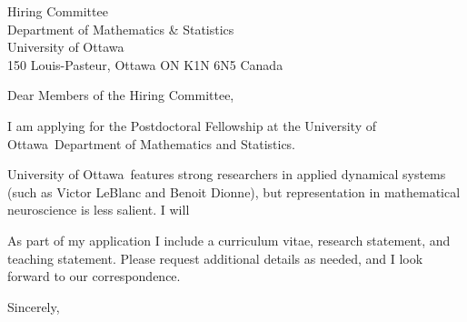 \documentclass[11pt,a4paper]{letter}
\begin{document}
\def\School{University of Ottawa}
\begin{letter}
{Hiring Committee\\
Department of Mathematics \& Statistics\\
University of Ottawa\\
150 Louis-Pasteur, Ottawa ON K1N 6N5 Canada}


\opening{Dear Members of the Hiring Committee,}

I am applying for the Postdoctoral Fellowship at the \School~Department of Mathematics and Statistics. 



\School~features strong researchers in applied dynamical systems (such as Victor LeBlanc and Benoit Dionne), but representation in mathematical neuroscience is less salient. I will 



As part of my application I include a curriculum vitae, research statement, and teaching statement. Please request additional details as needed, and I look forward to our correspondence.

\closing{Sincerely,}
\end{letter}
\end{document}
